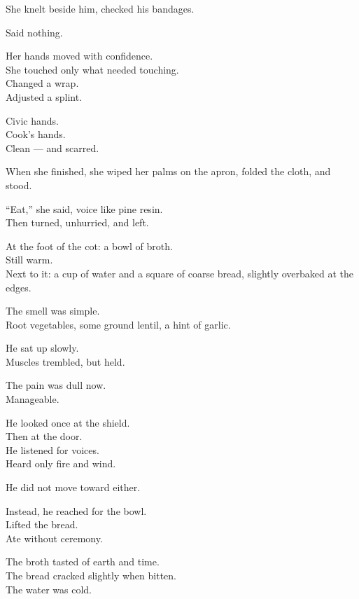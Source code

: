 \documentclass[9pt]{article}
\begin{document}
She knelt beside him, checked his bandages.

Said nothing.

\vspace{1em}

Her hands moved with confidence.\\
She touched only what needed touching.\\
Changed a wrap.\\
Adjusted a splint.

Civic hands.\\
Cook’s hands.\\
Clean — and scarred.

\vspace{1em}

When she finished, she wiped her palms on the apron, folded the cloth, and stood.

“Eat,” she said, voice like pine resin.\\
Then turned, unhurried, and left.

\vspace{1em}

At the foot of the cot: a bowl of broth.\\
Still warm.\\
Next to it: a cup of water and a square of coarse bread, slightly overbaked at the edges.

The smell was simple.\\
Root vegetables, some ground lentil, a hint of garlic.

\vspace{1em}

He sat up slowly.\\
Muscles trembled, but held.

The pain was dull now.\\
Manageable.

He looked once at the shield.\\
Then at the door.\\
He listened for voices.\\
Heard only fire and wind.

He did not move toward either.

Instead, he reached for the bowl.\\
Lifted the bread.\\
Ate without ceremony.

The broth tasted of earth and time.\\
The bread cracked slightly when bitten.\\
The water was cold.
\end{document}

